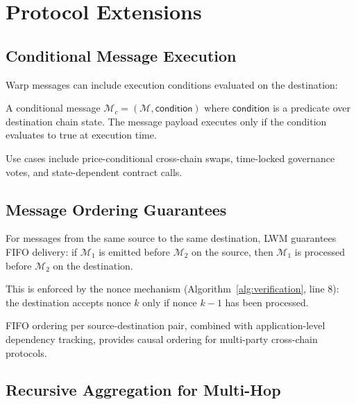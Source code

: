 \section{Protocol Extensions}
\label{sec:extensions}

\subsection{Conditional Message Execution}

Warp messages can include execution conditions evaluated on the destination:

\begin{definition}
A conditional message $\mathcal{M}_c = (\mathcal{M}, \mathsf{condition})$ where $\mathsf{condition}$ is a predicate over destination chain state. The message payload executes only if the condition evaluates to true at execution time.
\end{definition}

Use cases include price-conditional cross-chain swaps, time-locked governance votes, and state-dependent contract calls.

\subsection{Message Ordering Guarantees}

\begin{definition}
For messages from the same source to the same destination, LWM guarantees FIFO delivery: if $\mathcal{M}_1$ is emitted before $\mathcal{M}_2$ on the source, then $\mathcal{M}_1$ is processed before $\mathcal{M}_2$ on the destination.
\end{definition}

This is enforced by the nonce mechanism (Algorithm~\ref{alg:verification}, line 8): the destination accepts nonce $k$ only if nonce $k-1$ has been processed.

\begin{proposition}
FIFO ordering per source-destination pair, combined with application-level dependency tracking, provides causal ordering for multi-party cross-chain protocols.
\end{proposition}

\subsection{Recursive Aggregation for Multi-Hop}

